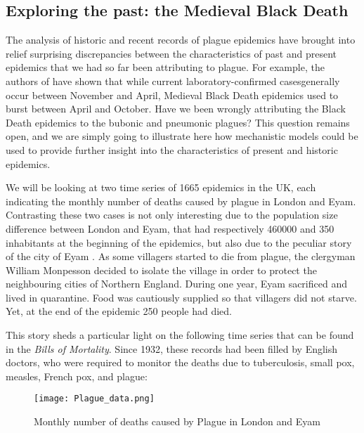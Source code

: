 \documentclass[a4paper,11pt,titlepage]{article}
\theoremstyle{plain} %
\begin{document}
\subsection{Exploring the past: the Medieval Black Death}


The analysis of historic and recent records of plague epidemics have brought into relief 
surprising discrepancies between the characteristics of past and present epidemics that we had so far been attributing to plague. For example, the authors of \cite{Welford2009} have shown that while current laboratory-confirmed casesgenerally occur between November and April, Medieval Black Death epidemics used to burst between April and October. Have we been wrongly attributing the Black Death epidemics to the bubonic and pneumonic plagues? This question remains open, and we are simply going to illustrate here how mechanistic models could be used to provide further insight into the characteristics of present and historic epidemics. 


We will be looking at two time series of 1665 epidemics in the UK, each indicating the monthly number of deaths
caused by plague in London and Eyam. Contrasting these two cases is not only interesting due to the population size difference between London  and Eyam, that had respectively 460000 and 350 inhabitants at the beginning of the epidemics, but also due to the peculiar story of the city of Eyam \cite{Race1995}. As some villagers started to die from plague, the clergyman William Monpesson decided to isolate the village in order to protect the neighbouring cities of Northern  England. During one year, Eyam sacrificed and lived in quarantine. Food was cautiously supplied so that villagers did not starve. Yet, at the end of the epidemic 250 people had died. 


This story sheds a particular light on the following time series that can be found in the \emph{Bills of Mortality}.  Since 1932, these records had been filled by English doctors, who were required to monitor the deaths due to tuberculosis, small pox, measles, French pox, and plague:

\begin{figure}[h]
\begin{centering}
\texttt{[image: Plague\_data.png]}
\par\end{centering}

\caption{\label{fig:What-could-habe}Monthly number of deaths caused by Plague in London and Eyam}
\end{figure}
\end{document}
